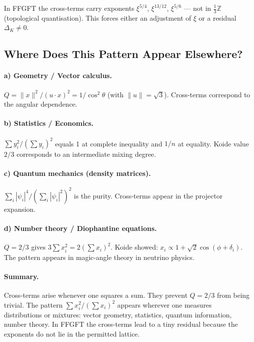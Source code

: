 In FFGFT the cross-terms carry exponents $\xi^{5/4}$, $\xi^{13/12}$, $\xi^{5/6}$
--- not in $\tfrac{1}{3}\mathbb{Z}$ (topological quantisation). This forces
either an adjustment of $\xi$ or a residual $\Delta_K\neq0$.

\subsection{Where Does This Pattern Appear Elsewhere?}

\paragraph{a) Geometry / Vector calculus.}
$Q=\|x\|^2/(u\cdot x)^2=1/\cos^2\theta$ (with $\|u\|=\sqrt{3}$).
Cross-terms correspond to the angular dependence.

\paragraph{b) Statistics / Economics.}
$\sum y_i^2/(\sum y_i)^2$ equals 1 at complete inequality and $1/n$ at equality.
Koide value $2/3$ corresponds to an intermediate mixing degree.

\paragraph{c) Quantum mechanics (density matrices).}
$\sum_i|\psi_i|^4/(\sum_i|\psi_i|^2)^2$ is the purity.
Cross-terms appear in the projector expansion.

\paragraph{d) Number theory / Diophantine equations.}
$Q=2/3$ gives $3\sum x_i^2=2(\sum x_i)^2$.
Koide showed: $x_i\propto1+\sqrt{2}\cos(\phi+\delta_i)$.
The pattern appears in magic-angle theory in neutrino physics.

\paragraph{Summary.}
Cross-terms arise whenever one squares a sum.
They prevent $Q=2/3$ from being trivial.
The pattern $\sum x_i^2/(\sum x_i)^2$ appears wherever one measures
distributions or mixtures: vector geometry, statistics, quantum information, number theory.
In FFGFT the cross-terms lead to a tiny residual because the exponents do not lie
in the permitted lattice.

